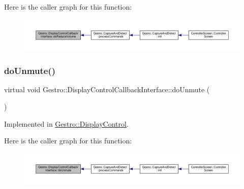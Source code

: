 Here is the caller graph for this function\+:
\nopagebreak
\begin{figure}[H]
\begin{center}
\leavevmode
\includegraphics[width=350pt]{class_gestro_1_1_display_control_callback_interface_a8648fb64585379393917e6b50e348070_icgraph}
\end{center}
\end{figure}
\mbox{\label{class_gestro_1_1_display_control_callback_interface_a74ddca7b1ef399a41f6025163407bb4d}} 
\subsubsection{\texorpdfstring{do\+Unmute()}{doUnmute()}}
{\footnotesize\ttfamily virtual void Gestro\+::\+Display\+Control\+Callback\+Interface\+::do\+Unmute (\begin{DoxyParamCaption}{ }\end{DoxyParamCaption})\hspace{0.3cm}{\ttfamily [pure virtual]}}



Implemented in \hyperlink{class_gestro_1_1_display_control_a210411b559d8c3ffb1498f49cfa26a6d}{Gestro\+::\+Display\+Control}.

Here is the caller graph for this function\+:
\nopagebreak
\begin{figure}[H]
\begin{center}
\leavevmode
\includegraphics[width=350pt]{class_gestro_1_1_display_control_callback_interface_a74ddca7b1ef399a41f6025163407bb4d_icgraph}
\end{center}
\end{figure}
\mbox{\label{class_gestro_1_1_display_control_callback_interface_a677aa306f08c548396a048c680bf5e10}} 
